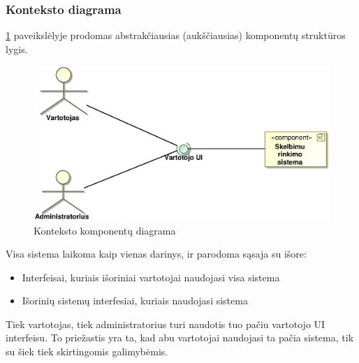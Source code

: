 \documentclass[12pt]{article}
\begin{document}
	\subsubsection{Konteksto diagrama}
	\ref{Components1} paveikslėlyje prodomas abstrakčiausias (aukščiausias) komponentų struktūros lygis.
	\begin{figure}[h]
		\begin{center}
			\includegraphics[width=\textwidth]{Komponentai1.eps}
			\caption{Konteksto komponentų diagrama\label{Components1}}
		\end{center}
	\end{figure}
	
	 Visa sistema laikoma kaip vienas darinys, ir parodoma sąsaja su išore:
	
	\begin{itemize}	
		\item Interfeisai, kuriais išoriniai vartotojai naudojasi visa sistema
		\item Išorinių sistemų interfesiai, kuriais naudojasi sistema
	\end{itemize}
	
	Tiek vartotojas, tiek administratorius turi naudotis tuo pačiu vartotojo UI interfeisu. To priežastis yra ta, kad abu vartotojai naudojasi ta pačia sistema, tik su šiek tiek skirtingomis galimybėmis.	
	\pagebreak
\end{document}
